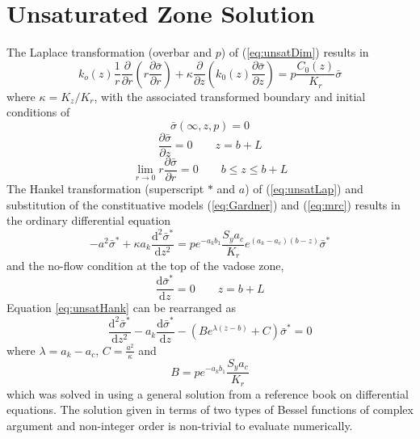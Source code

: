 \documentclass{article}
\begin{document}
\section{Unsaturated Zone Solution}
The Laplace transformation (overbar and $p$) of (\ref{eq:unsatDim}) results in
\begin{equation}
  \label{eq:unsatLap}
   k_o(z) \frac{1}{r} \frac{\partial}{\partial r} \left( r\frac{\partial \bar{\sigma}}{\partial r} \right) +\kappa \frac{\partial}{\partial z} \left( k_0(z) \frac{\partial \bar{\sigma}}{\partial z}\right) = p \frac{C_0(z)}{K_r}  \bar{\sigma}
\end{equation}
where $\kappa=K_z/K_r$, with the associated transformed boundary and initial conditions of
$$ \bar{\sigma}(\infty,z,p) = 0$$
$$ \frac{\partial \bar{\sigma}}{\partial z}=0 \qquad z=b+L$$
 $$\lim_{r \rightarrow 0} r \frac{\partial \bar{\sigma}}{\partial r} = 0 \qquad b\le z \le b+L$$
The Hankel transformation (superscript $\ast$ and $a$) of (\ref{eq:unsatLap}) and substitution of the constituative models (\ref{eq:Gardner}) and (\ref{eq:mrc}) results in the ordinary differential equation
\begin{equation}
  \label{eq:unsatHank}
   -a^2 \bar{\sigma}^{\ast} + \kappa a_k \frac{\mathrm{d}^2 \bar{\sigma}^{\ast}}{\mathrm{d} z^2}  = p e^{-a_k b_1} \frac{S_y a_c} {K_r}  e^{\left(a_k -a_c \right)\left( b - z\right)} \bar{\sigma}^{\ast} 
\end{equation}
and the no-flow condition at the top of the vadose zone, 
$$ \frac{\mathrm{d}\bar{\sigma}^{\ast}}{\mathrm{d}z}=0 \qquad z=b+L $$
Equation \ref{eq:unsatHank} can be rearranged as
\begin{equation}
  \label{eq:mn-d5}
  \frac{\mathrm{d}^2 \bar{\sigma}^{\ast}}{\mathrm{d}z^2} - a_k \frac{\mathrm{d} \bar{\sigma}^{\ast}}{\mathrm{d}z} - \left( B e^{\lambda (z-b)} + C\right) \bar{\sigma}^{\ast}=0
\end{equation}
where $\lambda = a_k-a_c$, $C=\frac{a^2}{\kappa}$ and
$$B = p e^{-a_k b_1} \frac{S_y a_c} {K_r} $$
which was solved in \cite{mishra10} using a general solution from a reference book on differential equations.  The solution given in terms of two types of Bessel functions of complex argument and non-integer order is non-trivial to evaluate numerically. 
\end{document}
